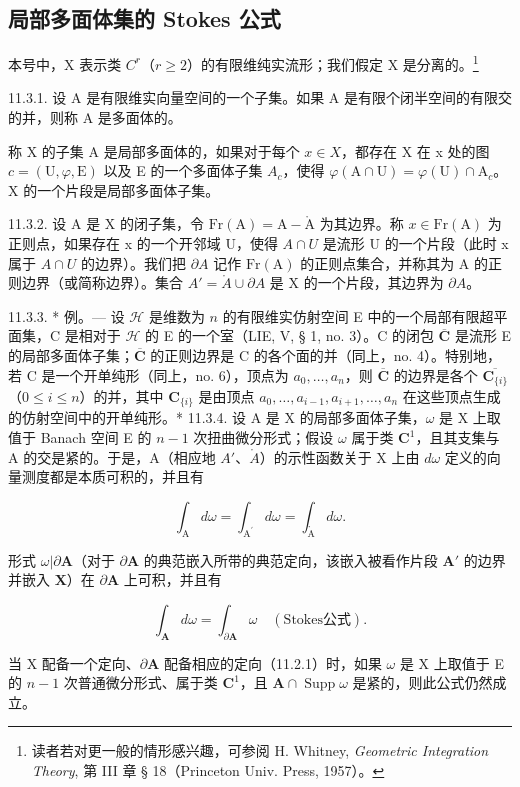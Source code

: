 \subsection{局部多面体集的 Stokes 公式}

本号中，X 表示类 \(C^{r}\)（\(r \geqslant 2\)）的有限维纯实流形；我们假定 X 是分离的。\footnote{读者若对更一般的情形感兴趣，可参阅 H. Whitney, \emph{Geometric Integration Theory}, 第 III 章 § 18（Princeton Univ. Press, 1957）。}

11.3.1. 设 A 是有限维实向量空间的一个子集。如果 A 是有限个闭半空间的有限交的并，则称 A 是多面体的。

称 X 的子集 A 是局部多面体的，如果对于每个 \(x \in X\)，都存在 X 在 x 处的图 \(c = (\mathrm{U}, \varphi, \mathrm{E})\) 以及 E 的一个多面体子集 \(A_{c}\)，使得 \(\varphi(\mathrm{A} \cap \mathrm{U}) = \varphi(\mathrm{U}) \cap \mathrm{A}_{c}\)。X 的一个片段是局部多面体子集。

11.3.2. 设 A 是 X 的闭子集，令 \(\mathrm{Fr}(\mathrm{A}) = \mathrm{A} - \mathring{\mathrm{A}}\) 为其边界。称 \(x \in \mathrm{Fr}(\mathrm{A})\) 为正则点，如果存在 x 的一个开邻域 U，使得 \(A \cap U\) 是流形 U 的一个片段（此时 x 属于 \(A \cap U\) 的边界）。我们把 \(\partial A\) 记作 \(\mathrm{Fr}(\mathrm{A})\) 的正则点集合，并称其为 A 的正则边界（或简称边界）。集合 \(A' = \mathring{A} \cup \partial A\) 是 X 的一个片段，其边界为 \(\partial A\)。

11.3.3. * 例。--- 设 \(\mathcal{H}\) 是维数为 \(n\) 的有限维实仿射空间 E 中的一个局部有限超平面集，C 是相对于 \(\mathcal{H}\) 的 E 的一个室（LIE, V, § 1, no. 3）。C 的闭包 \(\overline{\mathbf{C}}\) 是流形 E 的局部多面体子集；\(\overline{\mathbf{C}}\) 的正则边界是 C 的各个面的并（同上，no. 4）。特别地，若 C 是一个开单纯形（同上，no. 6），顶点为 \(a_0, \ldots, a_n\)，则 \(\overline{\mathbf{C}}\) 的边界是各个 \(\overline{\mathbf{C}_{\{i\}}}\)（\(0 \leqslant i \leqslant n\)）的并，其中 \(\mathbf{C}_{\{i\}}\) 是由顶点 \(a_0, \ldots, a_{i-1}, a_{i+1}, \ldots, a_n\) 在这些顶点生成的仿射空间中的开单纯形。*
11.3.4. 设 A 是 X 的局部多面体子集，\(\omega\) 是 X 上取值于 Banach 空间 E 的 \(n - 1\) 次扭曲微分形式；假设 \(\omega\) 属于类 \(\mathbf{C}^1\)，且其支集与 A 的交是紧的。于是，A（相应地 \(A'\)、\(\mathring{A}\)）的示性函数关于 X 上由 \(d\omega\) 定义的向量测度都是本质可积的，并且有

\[
\int_ {\mathrm{A}} d \omega = \int_ {\mathrm{A} ^ {\prime}} d \omega = \int_ {\mathring{\mathrm{A}}} d \omega.
\]

形式 \(\omega|\partial\mathbf{A}\)（对于 \(\partial\mathbf{A}\) 的典范嵌入所带的典范定向，该嵌入被看作片段 \(\mathbf{A}'\) 的边界并嵌入 \(\mathbf{X}\)）在 \(\partial\mathbf{A}\) 上可积，并且有

\[
\int_ {\mathbf {A}} d \omega = \int_ {\partial \mathbf {A}} \omega \quad (\text{Stokes公式}).
\]

当 X 配备一个定向、\(\partial\mathbf{A}\) 配备相应的定向（11.2.1）时，如果 \(\omega\) 是 X 上取值于 E 的 \(n-1\) 次普通微分形式、属于类 \(\mathbf{C}^{1}\)，且 \(\mathbf{A}\cap\operatorname{Supp}\omega\) 是紧的，则此公式仍然成立。

